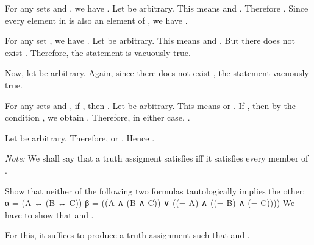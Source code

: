 \startexercises [title={\getvariable{document}{author}  \hfill  \getvariable{document}{course}: HW1  \hfill  2019-09-10}]
	
	\startexercise [title={Notes, 1.8}]
		For any sets  and , we have .
	\stopexercise
	\startsolution
		Let  be arbitrary. This means  and . Therefore . Since every element in  is also an element of , we have .
	\stopsolution

	\startexercise [title={Notes, 1.10}]
		For any set , we have .
	\stopexercise
	\startsolution
		  \qquad
		Let  be arbitrary. This means  and . But there does not exist . Therefore, the statement is vacuously true.

		  \qquad
		Now, let  be arbitrary. Again, since there does not exist , the statement vacuously true.
	\stopsolution

	\startexercise [title={Notes, 1.13}]
		For any sets  and , if , then .
	\stopexercise
	\startsolution
		  \qquad
		Let  be arbitrary. This means  or . If , then by the condition , we obtain . Therefore, in either case, .

		  \qquad
		Let  be arbitrary. Therefore,  or . Hence .
	\stopsolution

\stopexercises


\startexercises [title={\getvariable{document}{author}  \hfill  \getvariable{document}{course}: HW2  \hfill  2019-09-24}]

	\emph{Note:} We shall say that a truth assigment  satisfies  iff it satisfies every member of .
	
	\startexercise [title={Enderton, 1.2.1}]
		Show that neither of the following two formulas tautologically implies the other:
		\startformula  \startalign[align={right, left}]
			\NC  α =  \NC  (A ↔ (B ↔ C))  \NR
			\NC  β =  \NC  ((A ∧ (B ∧ C)) ∨ ((¬ A) ∧ ((¬ B) ∧ (¬ C))))  \NR
		\stopalign  \stopformula
	\stopexercise
	\startsolution
		We have to show that  and .

		  \qquad
		For this, it suffices to produce a truth assignment  such that  and .

